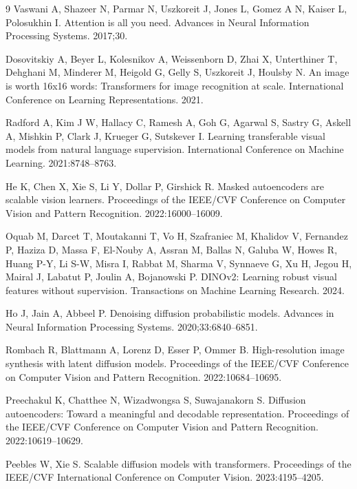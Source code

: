 \documentclass[preprint,12pt,number]{elsarticle}
\begin{document}
\begin{thebibliography}{9}
Vaswani A, Shazeer N, Parmar N, Uszkoreit J, Jones L, Gomez A N, Kaiser L, Polosukhin I. Attention is all you need. Advances in Neural Information Processing Systems. 2017;30.

Dosovitskiy A, Beyer L, Kolesnikov A, Weissenborn D, Zhai X, Unterthiner T, Dehghani M, Minderer M, Heigold G, Gelly S, Uszkoreit J, Houlsby N. An image is worth 16x16 words: Transformers for image recognition at scale. International Conference on Learning Representations. 2021.

Radford A, Kim J W, Hallacy C, Ramesh A, Goh G, Agarwal S, Sastry G, Askell A, Mishkin P, Clark J, Krueger G, Sutskever I. Learning transferable visual models from natural language supervision. International Conference on Machine Learning. 2021:8748--8763.

He K, Chen X, Xie S, Li Y, Dollar P, Girshick R. Masked autoencoders are scalable vision learners. Proceedings of the IEEE/CVF Conference on Computer Vision and Pattern Recognition. 2022:16000--16009.

Oquab M, Darcet T, Moutakanni T, Vo H, Szafraniec M, Khalidov V, Fernandez P, Haziza D, Massa F, El-Nouby A, Assran M, Ballas N, Galuba W, Howes R, Huang P-Y, Li S-W, Misra I, Rabbat M, Sharma V, Synnaeve G, Xu H, Jegou H, Mairal J, Labatut P, Joulin A, Bojanowski P. DINOv2: Learning robust visual features without supervision. Transactions on Machine Learning Research. 2024.

Ho J, Jain A, Abbeel P. Denoising diffusion probabilistic models. Advances in Neural Information Processing Systems. 2020;33:6840--6851.

Rombach R, Blattmann A, Lorenz D, Esser P, Ommer B. High-resolution image synthesis with latent diffusion models. Proceedings of the IEEE/CVF Conference on Computer Vision and Pattern Recognition. 2022:10684--10695.

Preechakul K, Chatthee N, Wizadwongsa S, Suwajanakorn S. Diffusion autoencoders: Toward a meaningful and decodable representation. Proceedings of the IEEE/CVF Conference on Computer Vision and Pattern Recognition. 2022:10619--10629.

Peebles W, Xie S. Scalable diffusion models with transformers. Proceedings of the IEEE/CVF International Conference on Computer Vision. 2023:4195--4205.


\end{thebibliography}
\end{document}
